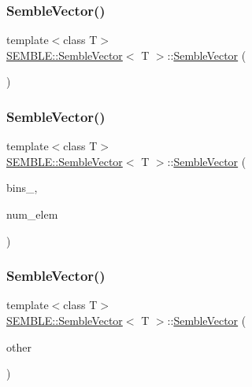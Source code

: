 \subsubsection{\texorpdfstring{SembleVector()}{SembleVector()}\hspace{0.1cm}{\footnotesize\ttfamily [5/8]}}
{\footnotesize\ttfamily template$<$class T$>$ \\
\mbox{\hyperlink{structSEMBLE_1_1SembleVector}{S\+E\+M\+B\+L\+E\+::\+Semble\+Vector}}$<$ T $>$\+::\mbox{\hyperlink{structSEMBLE_1_1SembleVector}{Semble\+Vector}} (\begin{DoxyParamCaption}\item[{void}]{ }\end{DoxyParamCaption})}

\mbox{\label{structSEMBLE_1_1SembleVector_a84340fccafe642a4754727fbc95e6356}} 
\subsubsection{\texorpdfstring{SembleVector()}{SembleVector()}\hspace{0.1cm}{\footnotesize\ttfamily [6/8]}}
{\footnotesize\ttfamily template$<$class T$>$ \\
\mbox{\hyperlink{structSEMBLE_1_1SembleVector}{S\+E\+M\+B\+L\+E\+::\+Semble\+Vector}}$<$ T $>$\+::\mbox{\hyperlink{structSEMBLE_1_1SembleVector}{Semble\+Vector}} (\begin{DoxyParamCaption}\item[{int}]{bins\+\_\+,  }\item[{int}]{num\+\_\+elem }\end{DoxyParamCaption})}

\mbox{\label{structSEMBLE_1_1SembleVector_a929ee26afcab4cb287ad02440bb6bde2}} 
\subsubsection{\texorpdfstring{SembleVector()}{SembleVector()}\hspace{0.1cm}{\footnotesize\ttfamily [7/8]}}
{\footnotesize\ttfamily template$<$class T$>$ \\
\mbox{\hyperlink{structSEMBLE_1_1SembleVector}{S\+E\+M\+B\+L\+E\+::\+Semble\+Vector}}$<$ T $>$\+::\mbox{\hyperlink{structSEMBLE_1_1SembleVector}{Semble\+Vector}} (\begin{DoxyParamCaption}\item[{const \mbox{\hyperlink{structSEMBLE_1_1SembleVector}{Semble\+Vector}}$<$ T $>$ \&}]{other }\end{DoxyParamCaption})}

